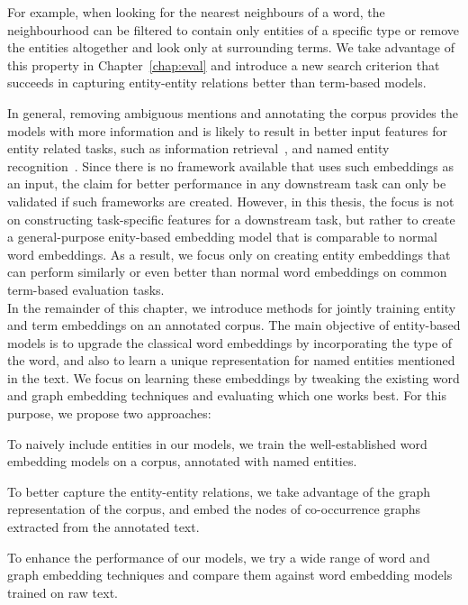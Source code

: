 \begin{compactitem}
For example, when looking for the nearest neighbours of a word, the neighbourhood can be filtered to contain only entities of a specific type or remove the entities altogether and look only at surrounding terms. We take advantage of this property in Chapter~\ref{chap:eval} and introduce a new search criterion that succeeds in capturing entity-entity relations better than term-based models.\\
\end{compactitem}
In general, removing ambiguous mentions and annotating the corpus provides the models with more information and is likely to result in better input features for entity related tasks, such as information retrieval~, and named entity recognition~.
Since there is no framework available that uses such embeddings as an input, the claim for better performance in any downstream task can only be validated if such frameworks are created. However, in this thesis, the focus is not on constructing task-specific features for a downstream task, but rather to create a general-purpose enity-based embedding model that is comparable to normal word embeddings. As a result, we focus only on creating entity embeddings that can perform similarly or even better than normal word embeddings on common term-based evaluation tasks.\\
In the remainder of this chapter, we introduce methods for jointly training entity and term embeddings on an annotated corpus. The main objective of entity-based models is to upgrade the classical word embeddings by incorporating the type of the word, and also to learn a unique representation for named entities mentioned in the text. We focus on learning these embeddings by tweaking the existing word and graph embedding techniques and evaluating which one works best. For this purpose, we propose two approaches: 
\begin{compactenum}
\item To naively include entities in our models, we train the well-established word embedding models on a corpus, annotated with named entities. 
\item To better capture the entity-entity relations, we take advantage of the graph representation of the corpus, and embed the nodes of co-occurrence graphs extracted from the annotated text. 
\end{compactenum}
To enhance the performance of our models, we try a wide range of word and graph embedding  techniques and compare them against word embedding models trained on raw text.

